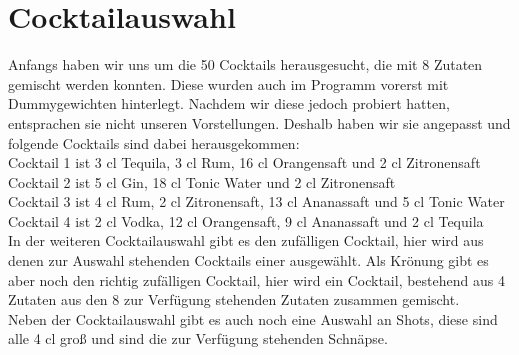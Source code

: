 \documentclass[10pt,a4paper]{report}
\begin{document}
	\chapter{Cocktailauswahl}
	Anfangs haben wir uns um die 50 Cocktails herausgesucht, die mit 8 Zutaten gemischt werden konnten. Diese wurden auch im Programm vorerst mit Dummygewichten hinterlegt. Nachdem wir diese jedoch probiert hatten, entsprachen sie nicht unseren Vorstellungen. Deshalb haben wir sie angepasst und folgende Cocktails sind dabei herausgekommen: \\
	Cocktail 1 ist 3 cl Tequila, 3 cl Rum, 16 cl Orangensaft und 2 cl Zitronensaft \\
	Cocktail 2 ist 5 cl Gin, 18 cl Tonic Water und 2 cl Zitronensaft\\
	Cocktail 3 ist 4 cl Rum, 2 cl Zitronensaft, 13 cl Ananassaft und 5 cl Tonic Water \\
	Cocktail 4 ist 2 cl Vodka, 12 cl Orangensaft, 9 cl Ananassaft und 2 cl Tequila \\
	In der weiteren Cocktailauswahl gibt es den zufälligen Cocktail, hier wird aus denen zur Auswahl stehenden Cocktails einer ausgewählt. Als Krönung gibt es aber noch den richtig zufälligen Cocktail, hier wird ein Cocktail, bestehend aus 4 Zutaten aus den 8 zur Verfügung stehenden Zutaten zusammen gemischt.\\
	Neben der Cocktailauswahl gibt es auch noch eine Auswahl an Shots, diese sind alle 4 cl groß und sind die zur Verfügung stehenden Schnäpse.\\  
	
\end{document}
